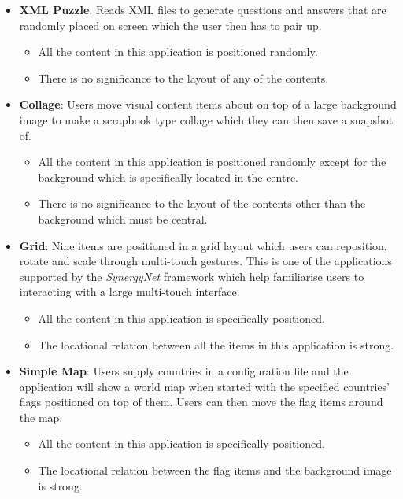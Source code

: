 \documentclass[review,5p,times,twocolumn]{elsarticle}
\begin{document}
\begin{itemize}
  \item \textbf{XML Puzzle}: 
  Reads XML files to generate questions and answers that are randomly placed on screen which the user then has to pair up. 
  \begin{itemize}
    \item  All the content in this application is positioned randomly. 
    \item There is no significance to the layout of any of the contents.
  \end{itemize}
  \item \textbf{Collage}: 
  Users move visual content items about on top of a large background image to make a scrapbook type collage which they can then save a snapshot of. 
    \begin{itemize}
    \item  All the content in this application is positioned randomly except for the background which is specifically located in the centre.
    \item There is no significance to the layout of the contents other than the background which must be central.
  \end{itemize}
  \item \textbf{Grid}: 
  Nine items are positioned in a grid layout which users can reposition, rotate and scale through multi-touch gestures.
  This is one of the applications supported by the {\emph{SynergyNet}} framework which help familiarise users to interacting with a large multi-touch interface. 
    \begin{itemize}
    \item  All the content in this application is specifically positioned.
    \item The locational relation between all the items in this application is strong.
  \end{itemize}
    \item \textbf{Simple Map}: 
  Users supply countries in a configuration file and the application will show a world map when started with the specified countries' flags positioned on top of them. 
  Users can then move the flag items around the map.
    \begin{itemize}
    \item  All the content in this application is specifically positioned.
    \item The locational relation between the flag items and the background image is strong.
  \end{itemize}
\end{itemize}
\end{document}
